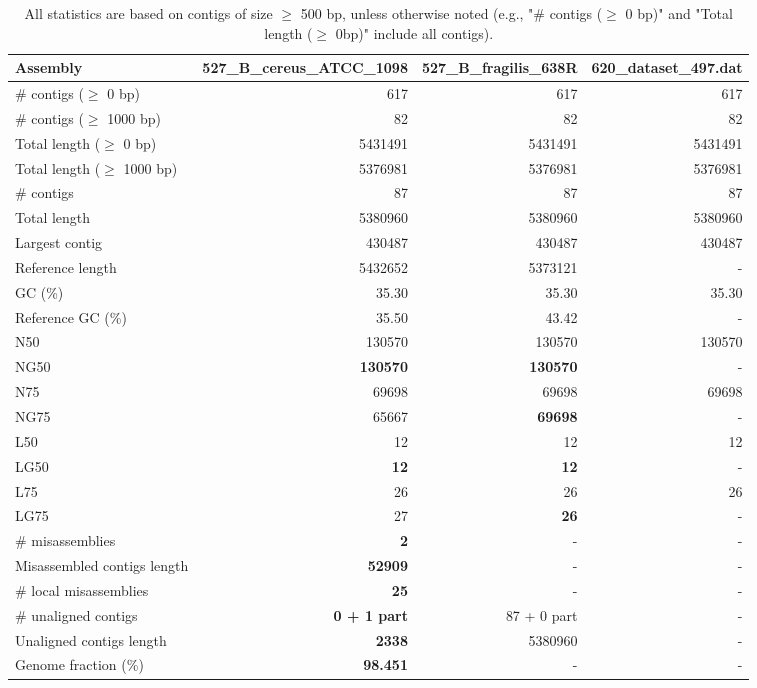 \documentclass[12pt,a4paper]{article}
\begin{document}
\begin{table}[ht]
\begin{center}
\caption{All statistics are based on contigs of size $\geq$ 500 bp, unless otherwise noted (e.g., "\# contigs ($\geq$ 0 bp)" and "Total length ($\geq$ 0bp)" include all contigs).}
\begin{tabular}{|l*{3}{|r}|}
\hline
Assembly & 527\_B\_cereus\_ATCC\_1098 & 527\_B\_fragilis\_638R & 620\_dataset\_497.dat \\ \hline
\# contigs ($\geq$ 0 bp) & 617 & 617 & 617 \\ \hline
\# contigs ($\geq$ 1000 bp) & 82 & 82 & 82 \\ \hline
Total length ($\geq$ 0 bp) & 5431491 & 5431491 & 5431491 \\ \hline
Total length ($\geq$ 1000 bp) & 5376981 & 5376981 & 5376981 \\ \hline
\# contigs & 87 & 87 & 87 \\ \hline
Total length & 5380960 & 5380960 & 5380960 \\ \hline
Largest contig & 430487 & 430487 & 430487 \\ \hline
Reference length & 5432652 & 5373121 & - \\ \hline
GC (\%) & 35.30 & 35.30 & 35.30 \\ \hline
Reference GC (\%) & 35.50 & 43.42 & - \\ \hline
N50 & 130570 & 130570 & 130570 \\ \hline
NG50 & {\bf 130570} & {\bf 130570} & - \\ \hline
N75 & 69698 & 69698 & 69698 \\ \hline
NG75 & 65667 & {\bf 69698} & - \\ \hline
L50 & 12 & 12 & 12 \\ \hline
LG50 & {\bf 12} & {\bf 12} & - \\ \hline
L75 & 26 & 26 & 26 \\ \hline
LG75 & 27 & {\bf 26} & - \\ \hline
\# misassemblies & {\bf 2} & - & - \\ \hline
Misassembled contigs length & {\bf 52909} & - & - \\ \hline
\# local misassemblies & {\bf 25} & - & - \\ \hline
\# unaligned contigs & {\bf 0 + 1 part} & 87 + 0 part & - \\ \hline
Unaligned contigs length & {\bf 2338} & 5380960 & - \\ \hline
Genome fraction (\%) & {\bf 98.451} & - & - \\ \hline

\end{tabular}
\end{center}
\end{table}
\end{document}
